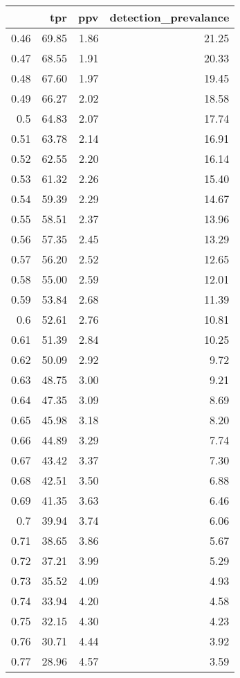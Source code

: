 \begin{table}[ht]
\centering
\begin{tabular}{rrrr}
  \hline
 & tpr & ppv & detection\_prevalance \\ 
  \hline
0.46 & 69.85 & 1.86 & 21.25 \\ 
  0.47 & 68.55 & 1.91 & 20.33 \\ 
  0.48 & 67.60 & 1.97 & 19.45 \\ 
  0.49 & 66.27 & 2.02 & 18.58 \\ 
  0.5 & 64.83 & 2.07 & 17.74 \\ 
  0.51 & 63.78 & 2.14 & 16.91 \\ 
  0.52 & 62.55 & 2.20 & 16.14 \\ 
  0.53 & 61.32 & 2.26 & 15.40 \\ 
  0.54 & 59.39 & 2.29 & 14.67 \\ 
  0.55 & 58.51 & 2.37 & 13.96 \\ 
  0.56 & 57.35 & 2.45 & 13.29 \\ 
  0.57 & 56.20 & 2.52 & 12.65 \\ 
  0.58 & 55.00 & 2.59 & 12.01 \\ 
  0.59 & 53.84 & 2.68 & 11.39 \\ 
  0.6 & 52.61 & 2.76 & 10.81 \\ 
  0.61 & 51.39 & 2.84 & 10.25 \\ 
  0.62 & 50.09 & 2.92 & 9.72 \\ 
  0.63 & 48.75 & 3.00 & 9.21 \\ 
  0.64 & 47.35 & 3.09 & 8.69 \\ 
  0.65 & 45.98 & 3.18 & 8.20 \\ 
  0.66 & 44.89 & 3.29 & 7.74 \\ 
  0.67 & 43.42 & 3.37 & 7.30 \\ 
  0.68 & 42.51 & 3.50 & 6.88 \\ 
  0.69 & 41.35 & 3.63 & 6.46 \\ 
  0.7 & 39.94 & 3.74 & 6.06 \\ 
  0.71 & 38.65 & 3.86 & 5.67 \\ 
  0.72 & 37.21 & 3.99 & 5.29 \\ 
  0.73 & 35.52 & 4.09 & 4.93 \\ 
  0.74 & 33.94 & 4.20 & 4.58 \\ 
  0.75 & 32.15 & 4.30 & 4.23 \\ 
  0.76 & 30.71 & 4.44 & 3.92 \\ 
  0.77 & 28.96 & 4.57 & 3.59 \\ 

\end{tabular}
\end{table}
